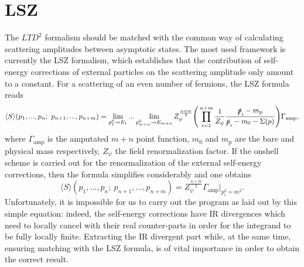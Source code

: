 \documentclass[11pt]{article}
\begin{document}
\section{LSZ}
\label{sec:LSZ}

The $LTD^2$ formalism should be matched with the common way of calculating scattering amplitudes between asymptotic states. The most used framework is currently the LSZ formalism, which establishes that the contribution of self-energy corrections of external particles on the scattering amplitude only amount to a constant. For a scattering of an even number of fermions, the LSZ formula reads
\begin{equation}
\langle S \rangle(p_1,...,p_n; \ p_{n+1},...,p_{n+m})=\lim_{p_1^0\rightarrow E_1}...\lim_{p_{m+n}^0\rightarrow E_{m+n}} Z_\psi^{\frac{n+m}{2}}\Bigg(\prod_{i=1}^{n+m}\frac{1}{Z_\psi}\frac{\slashed{p}_i -m_\text{p}}{\slashed{p}_i -m_0-\Sigma(p)}\Bigg)\Gamma_{\text{amp}},
\end{equation}
where $\Gamma_{\text{amp}}$ is the amputated $m+n$ point function, $m_0$ and $m_\text{p}$ are the bare and physical mass respectively, $Z_\psi$ the field renormalization factor.
If the onshell scheme is carried out for the renormalization of the external self-energy corrections, then the formula simplifies considerably and one obtains
\begin{equation}\label{lsz2}
\langle S \rangle(p_1,...,p_n; \ p_{n+1},...,p_{n+m})=Z_\psi^{\frac{n+m}{2}}\Gamma_{\text{amp}}\big|_{p_i^2=m^2}.
\end{equation}
Unfortunately, it is impossible for us to carry out the program as laid out by this simple equation: indeed, the self-energy corrections have IR divergences which need to locally cancel with their real counter-parts in order for the integrand to be fully locally finite. Extracting the IR divergent part while, at the same time, ensuring matching with the LSZ formula, is of vital importance in order to obtain the correct result. 
\end{document}
